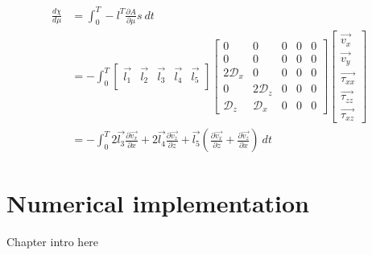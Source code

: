 \documentclass[fleqn,11pt]{SelfArx} %
\newcommand{\pder}[2][]{\frac{\partial#1}{\partial#2}}
\theoremstyle{definition}
\begin{document}
\begin{equation}
\begin{aligned}
\frac{d\chi}{d\mu} &= \int_0^T - l^T \pder[A]{\mu} s\ dt \\
&=-\int_0^T
 \begin{bmatrix}
\vec{l_1}&\vec{l_2}&\vec{l_3} &\vec{l_4} & \vec{l_5}\\
\end{bmatrix}
 \begin{bmatrix}
0 & 0 & 0 & 0 & 0 \\
0  & 0 & 0&0&0\\
2\mathcal{D}_x & 0 & 0&0&0\\
0 &2\mathcal{D}_z&0&0&0\\
\mathcal{D}_z&\mathcal{D}_x&0&0&0
\end{bmatrix}
\begin{bmatrix}
\vec{{v_x}}\\
\vec{{v_y}}\\
\vec{{\tau_{xx}}}\\
\vec{{\tau_{zz}}}\\
\vec{{\tau_{xz}}}
\end{bmatrix} \\{}
&=-\int_0^T 2\vec{l_3} \pder[\vec{v_x}]{x} + 2\vec{l_4} \pder[\vec{v_z}]{z} + \vec{l_5}\left(\pder[\vec{v_x}]{z} + \pder[\vec{v_z}]{x}\right) \ dt
\end{aligned}
\end{equation}


\section{Numerical implementation}
Chapter intro here
\end{document}
